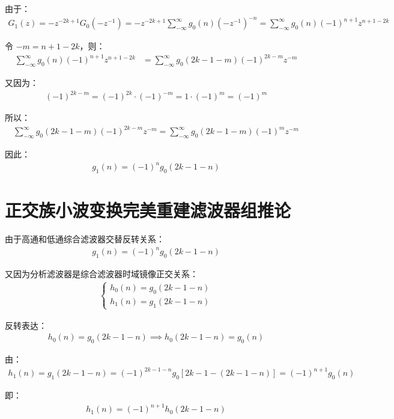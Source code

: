\documentclass{article}
\begin{document}
由于：
\begin{align*}
    G_1(z)=-z^{-2k+1}G_0(-z^{-1})=-z^{-2k+1}\sum_{-\infty}^{\infty}g_0(n)(-z^{-1})^{-n}=\sum_{-\infty}^{\infty}g_0(n)(-1)^{n+1}z^{n+1-2k}
\end{align*}

令 $-m=n+1-2k$，则：
\begin{align*}
    \sum_{-\infty}^{\infty}g_0(n)(-1)^{n+1}z^{n+1-2k}&=\sum_{-\infty}^{\infty}g_0(2k-1-m)(-1)^{2k-m}z^{-m}
\end{align*}

又因为：
\begin{align*}
    (-1)^{2k-m}=(-1)^{2k}\cdot(-1)^{-m}=1\cdot(-1)^m=(-1)^m
\end{align*}

所以：
\begin{align*}
    \sum_{-\infty}^{\infty}g_0(2k-1-m)(-1)^{2k-m}z^{-m}=\sum_{-\infty}^{\infty}g_0(2k-1-m)(-1)^{m}z^{-m}
\end{align*}

因此：
\begin{align*}
    g_1(n)=(-1)^ng_0(2k-1-n)
\end{align*}



\section{正交族小波变换完美重建滤波器组推论}
由于高通和低通综合滤波器交替反转关系：
\begin{align*}
    g_1(n)=(-1)^ng_0(2k-1-n)
\end{align*}

又因为分析滤波器是综合滤波器时域镜像正交关系：
\begin{align*}
    \begin{cases}
        h_0(n)=g_0(2k-1-n)
        \\[10pt]
        h_1(n)=g_1(2k-1-n)
    \end{cases}
\end{align*}

反转表达：
\begin{align*}
    h_0(n)=g_0(2k-1-n)\implies h_0(2k-1-n)=g_0(n)
\end{align*}

由：
\begin{align*}
    h_1(n)=g_1(2k-1-n)=(-1)^{2k-1-n}g_0\left[2k-1-(2k-1-n)\right]=(-1)^{n+1}g_0(n)
\end{align*}

即：
\begin{align*}
    h_1(n)=(-1)^{n+1}h_0(2k-1-n)
\end{align*}
\end{document}
